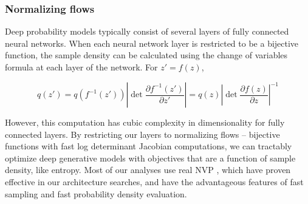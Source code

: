 \documentclass[11pt]{article}
\begin{document}
\subsubsection{Normalizing flows}\label{methods_NF}
Deep probability models typically consist of several layers of fully connected neural networks.  When each neural network layer is restricted to be a bijective function, the sample density can be calculated using the change of variables formula at each layer of the network.  For $z' = f(z)$,

\begin{equation}
q(z') = q(f^{-1}(z')) \left| \det \frac{\partial f^{-1}(z')}{\partial z'} \right| = q(z) \left| \det \frac{\partial f(z)}{\partial z} \right|^{-1}
\end{equation}

However, this computation has cubic complexity in dimensionality for fully connected layers.  By restricting our layers to normalizing flows \cite{rezende2015variational} -- bijective functions with fast log determinant Jacobian computations, we can tractably optimize deep generative models with objectives that are a function of sample density, like entropy. Most of our analyses use real NVP \cite{dinh2017density}, which have proven effective in our architecture searches, and have the advantageous features of fast sampling and fast probability density evaluation.
\end{document}
